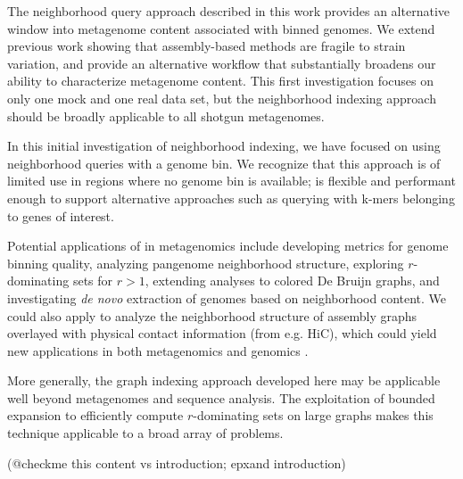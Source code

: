 The neighborhood query approach described in this work provides an
alternative window into metagenome content associated with binned genomes. We extend previous work
showing that assembly-based methods are fragile to strain
variation, and provide an alternative workflow that substantially
broadens our ability to characterize metagenome content.  This first
investigation focuses on only one mock and one real data set, but
the neighborhood indexing approach should be broadly applicable to
all shotgun metagenomes.

In this initial investigation of neighborhood indexing, we have
focused on using neighborhood queries with a genome bin.  We recognize
that this approach is of limited use in regions where no genome bin is
available; \sgc is flexible and performant enough to support
alternative approaches such as querying with k-mers belonging to genes
of interest.

Potential applications of \sgc in metagenomics include developing
metrics for genome binning quality, analyzing pangenome neighborhood
structure, exploring $r$-dominating sets for $r > 1$, extending analyses
to colored De Bruijn graphs, and investigating {\em de novo}
extraction of genomes based on neighborhood content.  We could also
apply \sgc to analyze the neighborhood structure of assembly graphs
overlayed with physical contact information (from e.g. HiC), which could
yield new applications in both metagenomics and genomics
\cite{Marbouty2014,Beitel2014}.

More generally, the graph indexing approach developed here may be
applicable well beyond metagenomes and sequence analysis.  The
exploitation of bounded expansion to efficiently compute $r$-dominating
sets on large graphs makes this technique applicable to a broad array
of problems.

(@checkme this content vs introduction; epxand introduction)
